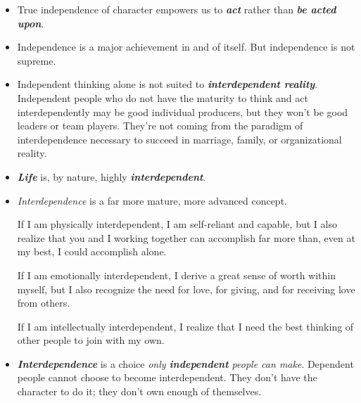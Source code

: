 \documentclass[11pt]{article}
\begin{document}
\begin{itemize}
\item True independence of character empowers us to \emph{\textbf{act}} rather than \emph{\textbf{be acted upon}}.

\item Independence is a major achievement in and of itself. But independence is not supreme. 

\item Independent thinking alone is not suited to \emph{\textbf{interdependent reality}}. Independent people who do not have the maturity to think and act interdependently may be good individual producers, but they won't be good leaders or team players. They're not coming from the paradigm of interdependence necessary to succeed in marriage, family, or organizational reality.

\item \emph{\textbf{Life}} is, by nature, highly \emph{\textbf{interdependent}}. 

\item \emph{Interdependence} is a far more mature, more advanced concept. 

If I am physically interdependent, I am self-reliant and capable, but I also realize that you and I working together can accomplish far more than, even at my best, I could accomplish alone. 

If I am emotionally interdependent, I derive a great sense of worth within myself, but I also recognize the need for love, for giving, and for receiving love from others.

If I am intellectually interdependent, I realize that I need the best thinking of other people to join with my own.

\item \emph{\textbf{Interdependence}} is a choice \emph{only \textbf{independent} people can make}. Dependent people cannot choose to become interdependent. They don't have the character to do it; they don't own enough of
themselves.
\end{itemize}
\end{document}
